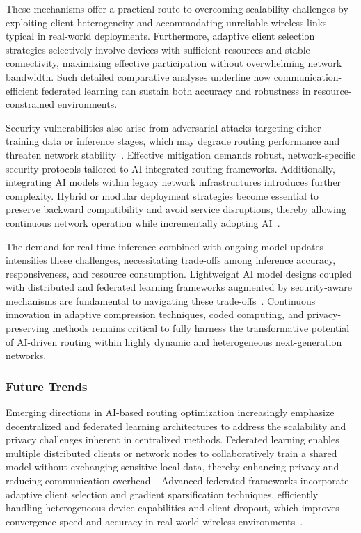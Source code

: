 \documentclass[sigconf]{acmart}
\begin{document}
These mechanisms offer a practical route to overcoming scalability challenges by exploiting client heterogeneity and accommodating unreliable wireless links typical in real-world deployments. Furthermore, adaptive client selection strategies selectively involve devices with sufficient resources and stable connectivity, maximizing effective participation without overwhelming network bandwidth. Such detailed comparative analyses underline how communication-efficient federated learning can sustain both accuracy and robustness in resource-constrained environments.

Security vulnerabilities also arise from adversarial attacks targeting either training data or inference stages, which may degrade routing performance and threaten network stability~\cite{ref4,ref53}. Effective mitigation demands robust, network-specific security protocols tailored to AI-integrated routing frameworks. Additionally, integrating AI models within legacy network infrastructures introduces further complexity. Hybrid or modular deployment strategies become essential to preserve backward compatibility and avoid service disruptions, thereby allowing continuous network operation while incrementally adopting AI~\cite{ref48}.

The demand for real-time inference combined with ongoing model updates intensifies these challenges, necessitating trade-offs among inference accuracy, responsiveness, and resource consumption. Lightweight AI model designs coupled with distributed and federated learning frameworks augmented by security-aware mechanisms are fundamental to navigating these trade-offs~\cite{ref4,ref53}. Continuous innovation in adaptive compression techniques, coded computing, and privacy-preserving methods remains critical to fully harness the transformative potential of AI-driven routing within highly dynamic and heterogeneous next-generation networks.

\subsubsection{Future Trends}

Emerging directions in AI-based routing optimization increasingly emphasize decentralized and federated learning architectures to address the scalability and privacy challenges inherent in centralized methods. Federated learning enables multiple distributed clients or network nodes to collaboratively train a shared model without exchanging sensitive local data, thereby enhancing privacy and reducing communication overhead~\cite{ref53}. Advanced federated frameworks incorporate adaptive client selection and gradient sparsification techniques, efficiently handling heterogeneous device capabilities and client dropout, which improves convergence speed and accuracy in real-world wireless environments~\cite{ref49}.
\end{document}
